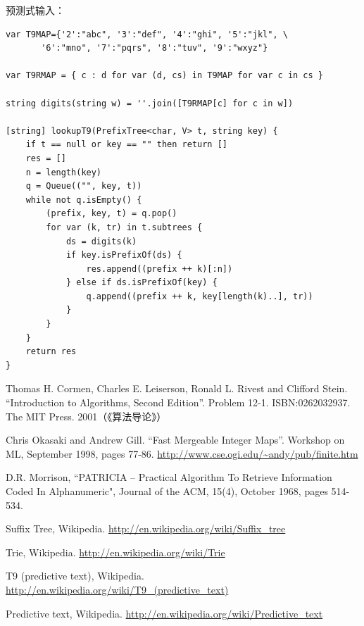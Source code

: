 \documentclass[b5paper]{ctexart}
\begin{document}
预测式输入：
\begin{lstlisting}[language = Bourbaki]
var T9MAP={'2':"abc", '3':"def", '4':"ghi", '5':"jkl", \
       '6':"mno", '7':"pqrs", '8':"tuv", '9':"wxyz"}

var T9RMAP = { c : d for var (d, cs) in T9MAP for var c in cs }

string digits(string w) = ''.join([T9RMAP[c] for c in w])

[string] lookupT9(PrefixTree<char, V> t, string key) {
    if t == null or key == "" then return []
    res = []
    n = length(key)
    q = Queue(("", key, t))
    while not q.isEmpty() {
        (prefix, key, t) = q.pop()
        for var (k, tr) in t.subtrees {
            ds = digits(k)
            if key.isPrefixOf(ds) {
                res.append((prefix ++ k)[:n])
            } else if ds.isPrefixOf(key) {
                q.append((prefix ++ k, key[length(k)..], tr))
            }
        }
    }
    return res
}
\end{lstlisting}

\ifx\wholebook\relax\else
\begin{thebibliography}{99}

Thomas H. Cormen, Charles E. Leiserson, Ronald L. Rivest and Clifford Stein.
``Introduction to Algorithms, Second Edition''. Problem 12-1. ISBN:0262032937. The MIT Press. 2001（《算法导论》）

Chris Okasaki and Andrew Gill. ``Fast Mergeable Integer Maps''. Workshop on ML, September 1998, pages 77-86.  \url{http://www.cse.ogi.edu/~andy/pub/finite.htm}

D.R. Morrison, ``PATRICIA -- Practical Algorithm To Retrieve  Information Coded In Alphanumeric", Journal of the ACM, 15(4), October 1968, pages 514-534.

Suffix Tree, Wikipedia. \url{http://en.wikipedia.org/wiki/Suffix_tree}

Trie, Wikipedia. \url{http://en.wikipedia.org/wiki/Trie}

T9 (predictive text), Wikipedia. \url{http://en.wikipedia.org/wiki/T9_(predictive_text)}

Predictive text,
Wikipedia. \url{http://en.wikipedia.org/wiki/Predictive_text}

\end{thebibliography}
\end{document}
